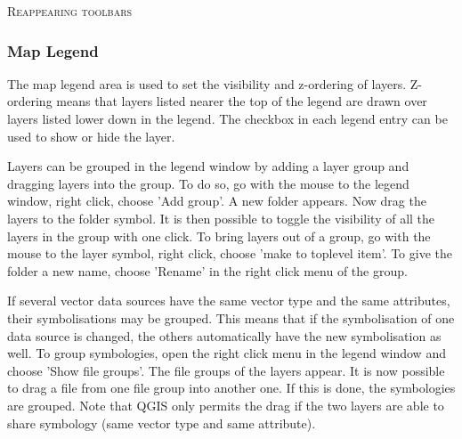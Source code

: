 \begin{Tip}
\caption{\textsc{Reappearing toolbars}} 
\end{Tip}


\subsubsection{Map Legend}\label{label_legend}

The map legend area is used to set the visibility and z-ordering of layers.
Z-ordering means that layers listed nearer the top of the legend are drawn
over layers listed lower down in the legend. The checkbox in each legend
entry can be used to show or hide the layer.

Layers can be grouped in the legend window by adding a layer group and dragging layers 
into the group. To do so, go with the mouse to the legend window, right click, choose 'Add group'. 
A new folder appears. Now drag the layers to the folder symbol. It is then possible to toggle the 
visibility of all the layers in the group with one click. To bring layers out of a group, go with 
the mouse to the layer symbol, right click, choose 'make to toplevel item'. To give the folder a 
new name, choose 'Rename' in the right click menu of the group.

If several vector data sources have the same vector type and the same attributes, their 
symbolisations may be grouped. This means that if the symbolisation of one data source is 
changed, the others automatically have the new symbolisation as well. To group symbologies, open 
the right click menu in the legend window and choose 'Show file groups'. The file groups of the 
layers appear. It is now possible to drag a file from one file group into another one. If this is done, 
the symbologies are grouped. Note that QGIS only permits the drag if the two layers are able to share 
symbology (same vector type and same attribute).  

%

